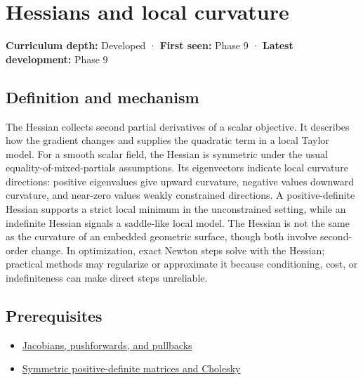 \hypertarget{appendix-6ac071f8b50c}{}\label{referencestart:appendix-6ac071f8b50c}
\section{Hessians and local curvature}\label{appendix-6ac071f8b50c-hessians-and-local-curvature}

\textbf{Curriculum depth:} Developed · \textbf{First seen:} Phase 9 · \textbf{Latest development:} Phase 9

\begin{allmightroledefinition}

\subsection{Definition and mechanism}\label{appendix-6ac071f8b50c-definition-and-mechanism}

The Hessian collects second partial derivatives of a scalar objective. It describes how the gradient changes and supplies the quadratic term in a local Taylor model. For a smooth scalar field, the Hessian is symmetric under the usual equality-of-mixed-partials assumptions. Its eigenvectors indicate local curvature directions: positive eigenvalues give upward curvature, negative values downward curvature, and near-zero values weakly constrained directions. A positive-definite Hessian supports a strict local minimum in the unconstrained setting, while an indefinite Hessian signals a saddle-like local model. The Hessian is not the same as the curvature of an embedded geometric surface, though both involve second-order change. In optimization, exact Newton steps solve with the Hessian; practical methods may regularize or approximate it because conditioning, cost, or indefiniteness can make direct steps unreliable.

\end{allmightroledefinition}

\subsection{Prerequisites}\label{appendix-6ac071f8b50c-prerequisites}

\begin{itemize}
\tightlist
\item
  \hyperref[appendix-d8a7ddb675eb]{Jacobians, pushforwards, and pullbacks}
\item
  \hyperref[appendix-50d2ea3c9b26]{Symmetric positive-definite matrices and Cholesky}
\end{itemize}

